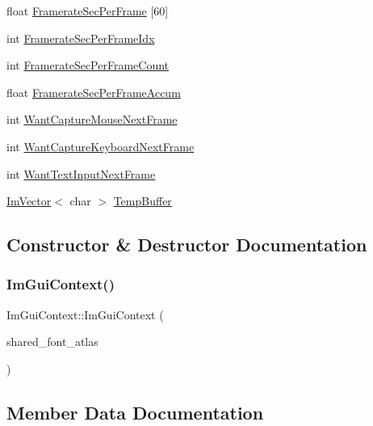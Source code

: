 \begin{DoxyCompactItemize}
\item 
float \hyperlink{structImGuiContext_a0c6faa7d9727acc9a3cc320dd056873f}{Framerate\+Sec\+Per\+Frame} \mbox{[}60\mbox{]}
\item 
int \hyperlink{structImGuiContext_a64a96ad72dd7009dba134f6214a4936e}{Framerate\+Sec\+Per\+Frame\+Idx}
\item 
int \hyperlink{structImGuiContext_a65a399070bea994471e5d935fa419651}{Framerate\+Sec\+Per\+Frame\+Count}
\item 
float \hyperlink{structImGuiContext_abcd18f2f8fedf0f45c3148b3e956e653}{Framerate\+Sec\+Per\+Frame\+Accum}
\item 
int \hyperlink{structImGuiContext_a7e7a9bbeaac9519abe29818ce6c2cc3b}{Want\+Capture\+Mouse\+Next\+Frame}
\item 
int \hyperlink{structImGuiContext_a0372056c72eac8b3e6de06c404caa5b3}{Want\+Capture\+Keyboard\+Next\+Frame}
\item 
int \hyperlink{structImGuiContext_abe551d35ea5c1aa61a4d5c785c8e0d9d}{Want\+Text\+Input\+Next\+Frame}
\item 
\hyperlink{structImVector}{Im\+Vector}$<$ char $>$ \hyperlink{structImGuiContext_aaf438bcb822841e3fc19a36d05219634}{Temp\+Buffer}
\end{DoxyCompactItemize}


\subsection{Constructor \& Destructor Documentation}
\mbox{\label{structImGuiContext_a5842ccae7b18271370b6d5f7f698d8bd}} 
\subsubsection{\texorpdfstring{Im\+Gui\+Context()}{ImGuiContext()}}
{\footnotesize\ttfamily Im\+Gui\+Context\+::\+Im\+Gui\+Context (\begin{DoxyParamCaption}\item[{\hyperlink{structImFontAtlas}{Im\+Font\+Atlas} $\ast$}]{shared\+\_\+font\+\_\+atlas }\end{DoxyParamCaption})\hspace{0.3cm}{\ttfamily [inline]}}



\subsection{Member Data Documentation}
\mbox{\label{structImGuiContext_a11c874eb6cf74ba9162bd1d01c4ccbcc}} 
